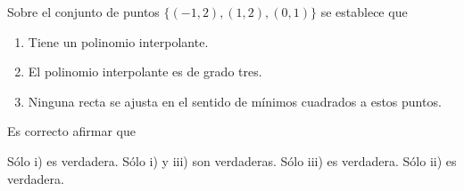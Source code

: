 \begin{pregunta}
\begin{cuerpo}
Sobre el conjunto de puntos
$\{(-1,2),(1,2),(0,1)\}$
se establece que 
\begin{enumerate}
	\item[i)] 	Tiene un polinomio interpolante.
    \item[ii)] 	El polinomio interpolante es de grado tres.
    \item[iii)] Ninguna recta se ajusta en el sentido de m\'inimos cuadrados a estos puntos.
\end{enumerate}
Es correcto afirmar que
\
\end{cuerpo}
\begin{multicols}{2}
\begin{alternativas}
{S\'olo i) es verdadera.} %
{Sólo i) y iii) son verdaderas.}
{Sólo iii) es verdadera.}
{Sólo ii) es verdadera.}
\end{alternativas}
\end{multicols}
\justificacion{5cm}
\end{pregunta}